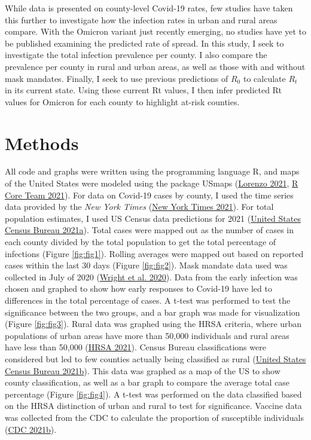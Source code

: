 \documentclass[
  12pt,
]{article}
\begin{document}
While data is presented on county-level Covid-19 rates, few studies have taken this further to investigate how the infection rates in urban and rural areas compare. With the Omicron variant just recently emerging, no studies have yet to be published examining the predicted rate of spread. In this study, I seek to investigate the total infection prevalence per county. I also compare the prevalence per county in rural and urban areas, as well as those with and without mask mandates. Finally, I seek to use previous predictions of \(R_0\) to calculate \(R_t\) in its current state. Using these current Rt values, I then infer predicted Rt values for Omicron for each county to highlight at-risk counties.

\hypertarget{methods}{%
\section{Methods}\label{methods}}

All code and graphs were written using the programming language R, and maps of the United States were modeled using the package USmaps (\protect\hyperlink{ref-lorenzo_usmap_2021}{Lorenzo 2021}, \protect\hyperlink{ref-r_core_team_r_2021}{R Core Team 2021}). For data on Covid-19 cases by county, I used the time series data provided by the \emph{New York Times} (\protect\hyperlink{ref-new_york_times_coronavirus_2021}{New York Times 2021}). For total population estimates, I used US Census data predictions for 2021 (\protect\hyperlink{ref-united_states_census_bureau_county_2021}{United States Census Bureau 2021a}). Total cases were mapped out as the number of cases in each county divided by the total population to get the total percentage of infections (Figure \ref{fig:fig1}). Rolling averages were mapped out based on reported cases within the last 30 days (Figure \ref{fig:fig2}). Mask mandate data used was collected in July of 2020 (\protect\hyperlink{ref-wright_tracking_2020}{Wright et al. 2020}). Data from the early infection was chosen and graphed to show how early responses to Covid-19 have led to differences in the total percentage of cases. A t-test was performed to test the significance between the two groups, and a bar graph was made for visualization (Figure \ref{fig:fig3}). Rural data was graphed using the HRSA criteria, where urban populations of urban areas have more than 50,000 individuals and rural areas have less than 50,000 (\protect\hyperlink{ref-hrsa_defining_2021}{HRSA 2021}). Census Bureau classifications were considered but led to few counties actually being classified as rural (\protect\hyperlink{ref-united_states_census_bureau_2010_2021}{United States Census Bureau 2021b}). This data was graphed as a map of the US to show county classification, as well as a bar graph to compare the average total case percentage (Figure \ref{fig:fig4}). A t-test was performed on the data classified based on the HRSA distinction of urban and rural to test for significance. Vaccine data was collected from the CDC to calculate the proportion of susceptible individuals (\protect\hyperlink{ref-cdc_covid-19_2021}{CDC 2021b}).
\end{document}
